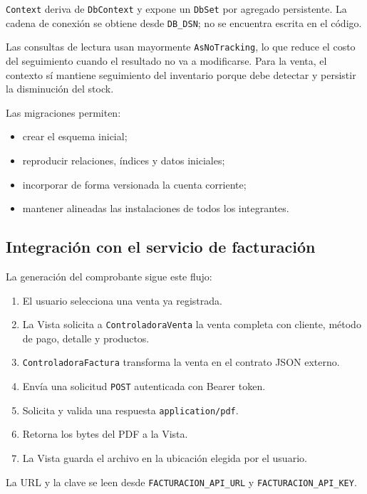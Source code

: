 \documentclass[12pt,a4paper]{article}
\begin{document}
\texttt{Context} deriva de \texttt{DbContext} y expone un \texttt{DbSet} por
agregado persistente. La cadena de conexión se obtiene desde
\texttt{DB\_DSN}; no se encuentra escrita en el código.

Las consultas de lectura usan mayormente \texttt{AsNoTracking}, lo que reduce
el costo del seguimiento cuando el resultado no va a modificarse. Para la
venta, el contexto sí mantiene seguimiento del inventario porque debe detectar
y persistir la disminución del stock.

Las migraciones permiten:

\begin{itemize}
    \item crear el esquema inicial;
    \item reproducir relaciones, índices y datos iniciales;
    \item incorporar de forma versionada la cuenta corriente;
    \item mantener alineadas las instalaciones de todos los integrantes.
\end{itemize}

\subsection{Integración con el servicio de facturación}

La generación del comprobante sigue este flujo:

\begin{enumerate}
    \item El usuario selecciona una venta ya registrada.
    \item La Vista solicita a \texttt{ControladoraVenta} la venta completa con
    cliente, método de pago, detalle y productos.
    \item \texttt{ControladoraFactura} transforma la venta en el contrato JSON
    externo.
    \item Envía una solicitud \texttt{POST} autenticada con Bearer token.
    \item Solicita y valida una respuesta \texttt{application/pdf}.
    \item Retorna los bytes del PDF a la Vista.
    \item La Vista guarda el archivo en la ubicación elegida por el usuario.
\end{enumerate}

La URL y la clave se leen desde \texttt{FACTURACION\_API\_URL} y
\texttt{FACTURACION\_API\_KEY}.
\end{document}
